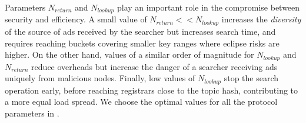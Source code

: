 Parameters $N_\textit{return}$ and $N_\textit{lookup}$ play an important role in the compromise between security and efficiency.
A small value of $N_\textit{return} << N_\textit{lookup}$ increases the \emph{diversity} of the source of ads received by the searcher but increases search time, and requires reaching buckets covering smaller key ranges where eclipse risks are higher.
On the other hand, values of a similar order of magnitude for $N_\textit{lookup}$ and $N_\textit{return}$ reduce overheads but increase the danger of a searcher receiving ads uniquely from malicious nodes.
Finally, low values of $N_\textit{lookup}$ stop the search operation early, before reaching registrars close to the topic hash, contributing to a more equal load spread. We choose the optimal values for all the protocol parameters in . 






